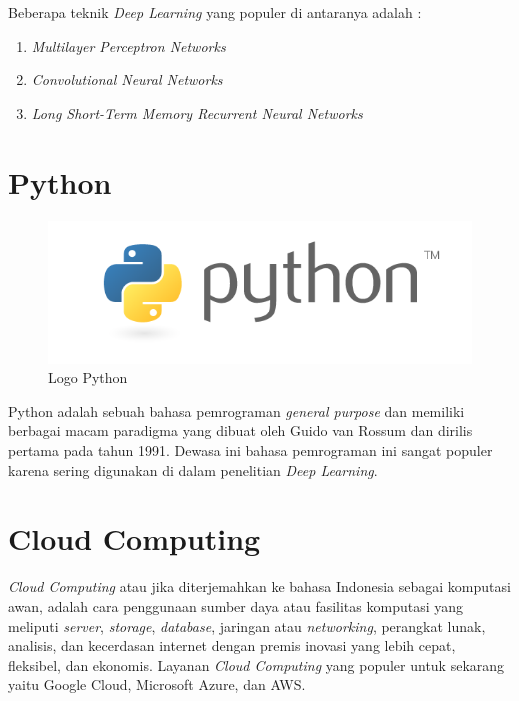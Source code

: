 Beberapa teknik \textit{Deep Learning} yang populer di antaranya adalah \cite{brownlee_2020}:

  \begin{enumerate}[nolistsep]
        
    \item \textit{Multilayer Perceptron Networks}

    \item \textit{Convolutional Neural Networks}

    \item \textit{Long Short-Term Memory Recurrent Neural Networks}

  \end{enumerate}

\section{Python}

  \begin{figure}[hbt!] \centering
    \includegraphics[scale=0.3]{gambar/python.png}
    \caption{Logo Python \cite{psf}}
    \label{fig:logoPython}
  \end{figure}

Python adalah sebuah bahasa pemrograman \textit{general purpose} dan memiliki berbagai macam paradigma yang dibuat oleh Guido van Rossum dan dirilis pertama pada tahun 1991.
Dewasa ini bahasa pemrograman ini sangat populer karena sering digunakan di dalam penelitian \textit{Deep Learning}.

\section{Cloud Computing}

\textit{Cloud Computing} atau jika diterjemahkan ke bahasa Indonesia sebagai komputasi awan, adalah cara penggunaan sumber daya atau fasilitas komputasi yang meliputi \textit{server}, \textit{storage}, \textit{database}, jaringan atau \textit{networking}, perangkat lunak, analisis, dan kecerdasan internet dengan premis inovasi yang lebih cepat, fleksibel, dan ekonomis.
Layanan \textit{Cloud Computing} yang populer untuk sekarang yaitu Google Cloud, Microsoft Azure, dan AWS.